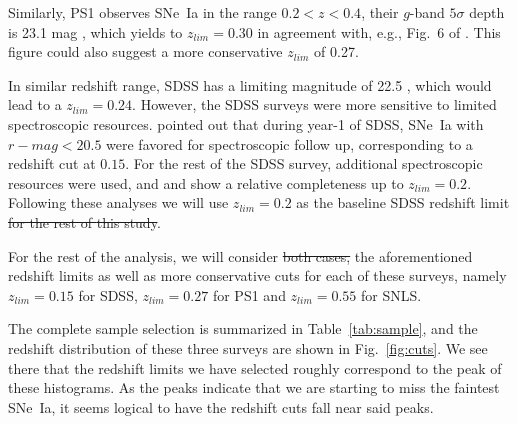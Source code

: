 \documentclass[]{aa} %
\newcommand{\nn}[1]{{\textcolor[rgb]{1, 0.27, 0}{#1}}}
\begin{document}
Similarly, PS1 observes SNe~Ia in the range $0.2<z<0.4$, their $g$-band
$5\sigma$ depth is 23.1 mag \citep{rest2014}, which yields to $z_{lim}=0.30$ in
agreement with, e.g., Fig.~6 of \cite{scolnic2018a}. This figure could also
suggest a more conservative $z_{lim}$ of 0.27.

In similar redshift range, SDSS has a limiting magnitude of
22.5 \citep{dilday2008,sako2008}, which would lead to a $z_{lim}=0.24$. However,
the SDSS surveys were more sensitive to limited spectroscopic resources.
\cite{kessler2009} \nn{pointed out} that during year-1 of SDSS, SNe~Ia with
$r-mag<20.5$ were favored for spectroscopic follow up, corresponding to a
redshift cut at $0.15$. For the rest of the SDSS survey, additional
spectroscopic resources were used, and \cite{kessler2009} and
\cite{dilday2008} show a relative completeness up to $z_{lim}=0.2$. Following
these analyses we will use $z_{lim}=0.2$ as the baseline SDSS redshift limit \sout{for
the rest of \nn{this study}}. 

For the rest of the analysis, we will consider \nn{\sout{both
cases,}} the \nn{aforementioned} redshift limits as well as more conservative cuts
for each of these surveys, namely $z_{lim}=0.15$ for SDSS, $z_{lim}=0.27$ for
PS1 and $z_{lim}=0.55$ for SNLS.

The complete sample selection is summarized in Table~\ref{tab:sample}, and the
redshift distribution of these three surveys are shown in Fig.~\ref{fig:cuts}.
We see there that the redshift limits we have selected roughly
correspond to the peak of these histograms. \nn{As the peaks indicate that we
are starting to miss the faintest SNe~Ia, it seems logical to have the redshift
cuts fall near said peaks.}
\end{document}
